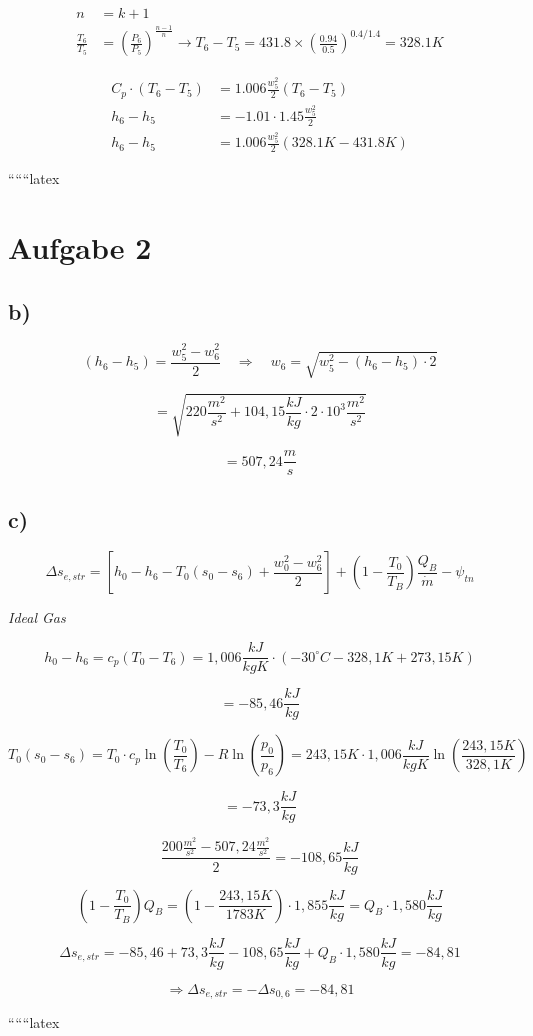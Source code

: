 
\begin{align*}
n &= k + 1 \\
\frac{T_6}{T_5} &= \left( \frac{P_6}{P_5} \right)^{\frac{n-1}{n}} \rightarrow T_6 - T_5 = 431.8 \times \left( \frac{0.94}{0.5} \right)^{0.4/1.4} = 328.1K
\end{align*}


\begin{align*}
C_p \cdot \left( T_6 - T_5 \right) &= 1.006 \frac{w_5^2}{2} \left( T_6 - T_5 \right) \\
h_6 - h_5 &= -1.01 \cdot 1.45 \frac{w_5^2}{2} \\
h_6 - h_5 &= 1.006 \frac{w_5^2}{2} \left( 328.1K - 431.8K \right)
\end{align*}

``````latex

\section*{Aufgabe 2}

\subsection*{b)}

\[
(h_6 - h_5) = \frac{w_5^2 - w_6^2}{2} \quad \Rightarrow \quad w_6 = \sqrt{w_5^2 - (h_6 - h_5) \cdot 2}
\]

\[
= \sqrt{220 \frac{m^2}{s^2} + 104,15 \frac{kJ}{kg} \cdot 2 \cdot 10^3 \frac{m^2}{s^2}}
\]

\[
= 507,24 \frac{m}{s}
\]

\subsection*{c)}

\[
\Delta s_{e, str} = \left[ h_0 - h_6 - T_0 (s_0 - s_6) + \frac{w_0^2 - w_6^2}{2} \right] + \left( 1 - \frac{T_0}{T_B} \right) \frac{Q_B}{\dot{m}} - \psi_{tn}
\]

\textit{Ideal Gas}

\[
h_0 - h_6 = c_p (T_0 - T_6) = 1,006 \frac{kJ}{kgK} \cdot (-30^\circ C - 328,1K + 273,15K)
\]

\[
= -85,46 \frac{kJ}{kg}
\]

\[
T_0 (s_0 - s_6) = T_0 \cdot c_p \ln \left( \frac{T_0}{T_6} \right) - R \ln \left( \frac{p_0}{p_6} \right) = 243,15K \cdot 1,006 \frac{kJ}{kgK} \ln \left( \frac{243,15K}{328,1K} \right)
\]

\[
= -73,3 \frac{kJ}{kg}
\]

\[
\frac{200 \frac{m^2}{s^2} - 507,24 \frac{m^2}{s^2}}{2} = -108,65 \frac{kJ}{kg}
\]

\[
\left( 1 - \frac{T_0}{T_B} \right) Q_B = \left( 1 - \frac{243,15K}{1783K} \right) \cdot 1,855 \frac{kJ}{kg} = Q_B \cdot 1,580 \frac{kJ}{kg}
\]

\[
\Delta s_{e, str} = -85,46 + 73,3 \frac{kJ}{kg} - 108,65 \frac{kJ}{kg} + Q_B \cdot 1,580 \frac{kJ}{kg} = -84,81
\]

\[
\Rightarrow \Delta s_{e, str} = -\Delta s_{0,6} = -84,81
\]

``````latex


